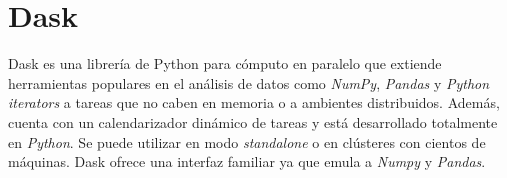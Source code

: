 \section{Dask}

Dask es una librería de Python para cómputo en paralelo que extiende herramientas populares en el análisis de datos como \textit{NumPy}, \textit{Pandas} y \textit{Python iterators} a tareas que no caben en memoria o a ambientes distribuidos. Además, cuenta con un calendarizador dinámico de tareas y está desarrollado totalmente en \textit{Python}. Se puede utilizar en modo \textit{standalone} o en clústeres con cientos de máquinas. Dask ofrece una interfaz familiar ya que emula a \textit{Numpy} y \textit{Pandas}. 




